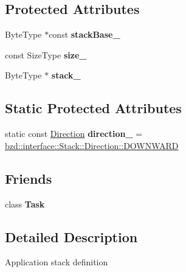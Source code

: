 \subsection*{Protected Attributes}
\begin{DoxyCompactItemize}
\item 
\mbox{\label{classbzd_1_1interface_1_1Stack_a39bfbc3280c697f9b8846dd522bcce9d}} 
Byte\+Type $\ast$const {\bfseries stack\+Base\+\_\+}
\item 
\mbox{\label{classbzd_1_1interface_1_1Stack_addae6819511cffe6a35ed088bddacdbb}} 
const Size\+Type {\bfseries size\+\_\+}
\item 
\mbox{\label{classbzd_1_1interface_1_1Stack_aebc216cdd30a8fe34cc3f89035b5513a}} 
Byte\+Type $\ast$ {\bfseries stack\+\_\+}
\end{DoxyCompactItemize}
\subsection*{Static Protected Attributes}
\begin{DoxyCompactItemize}
\item 
\mbox{\label{classbzd_1_1interface_1_1Stack_a13f179374f33bd1885bd6735204c2c9a}} 
static const \hyperlink{classbzd_1_1interface_1_1Stack_aee39c37ff1b2f48dcfd24a09c0999034}{Direction} {\bfseries direction\+\_\+} = \hyperlink{classbzd_1_1interface_1_1Stack_aee39c37ff1b2f48dcfd24a09c0999034acf045327606e788dbe14630a376af70e}{bzd\+::interface\+::\+Stack\+::\+Direction\+::\+D\+O\+W\+N\+W\+A\+RD}
\end{DoxyCompactItemize}
\subsection*{Friends}
\begin{DoxyCompactItemize}
\item 
\mbox{\label{classbzd_1_1interface_1_1Stack_aaa7728226b6ce66782e8816b1658dd9a}} 
class {\bfseries Task}
\end{DoxyCompactItemize}


\subsection{Detailed Description}
Application stack definition 

